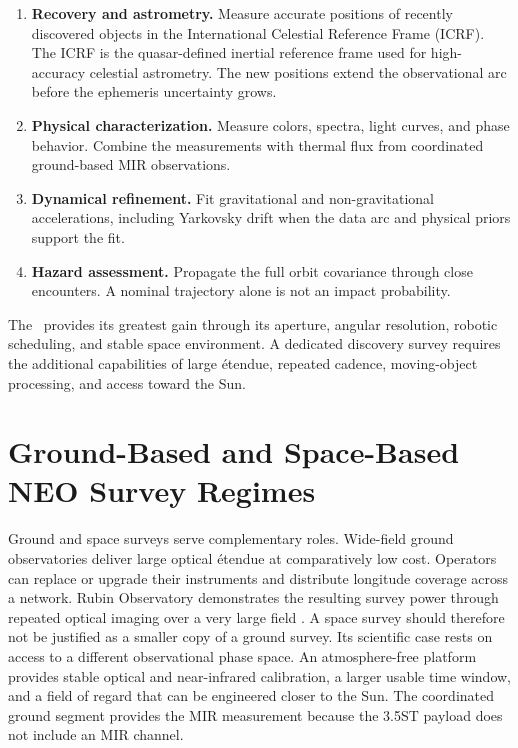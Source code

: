 \begin{enumerate}[leftmargin=7mm,itemsep=2mm]
\item \textbf{\color{cTeal}Recovery and astrometry.} Measure accurate
positions of recently discovered objects in the International Celestial
Reference Frame (ICRF). The ICRF is the quasar-defined inertial reference
frame used for high-accuracy celestial astrometry. The new positions extend
the observational arc before the ephemeris uncertainty grows.
\item \textbf{\color{cGold}Physical characterization.} Measure colors,
spectra, light curves, and phase behavior. Combine the measurements with
thermal flux from coordinated ground-based MIR observations.
\item \textbf{\color{cOrange}Dynamical refinement.} Fit gravitational and
non-gravitational accelerations, including Yarkovsky drift when the data arc
and physical priors support the fit.
\item \textbf{\color{cRed}Hazard assessment.} Propagate the full orbit
covariance through close encounters. A nominal trajectory alone is not an
impact probability.
\end{enumerate}

The \facility\ provides its greatest gain through its aperture, angular
resolution, robotic scheduling, and stable space environment. A dedicated
discovery survey requires the additional capabilities of large étendue,
repeated cadence, moving-object processing, and access toward the Sun.

\section{Ground-Based and Space-Based NEO Survey Regimes}
\label{sec:ground-space-surveys}

Ground and space surveys serve complementary roles. Wide-field ground
observatories deliver large optical étendue at comparatively low cost.
Operators can replace or upgrade their instruments and distribute longitude
coverage across a network. Rubin Observatory demonstrates the resulting
survey power through repeated optical imaging over a very large field
\cite{Ivezic2019}. A space survey should therefore not be justified as a
smaller copy of a ground survey. Its scientific case rests on access to a
different observational phase space. An atmosphere-free platform provides
stable optical and near-infrared calibration, a larger usable time window,
and a field of regard that can be engineered closer to the Sun. The
coordinated ground segment provides the MIR measurement because the 3.5ST
payload does not include an MIR channel.


